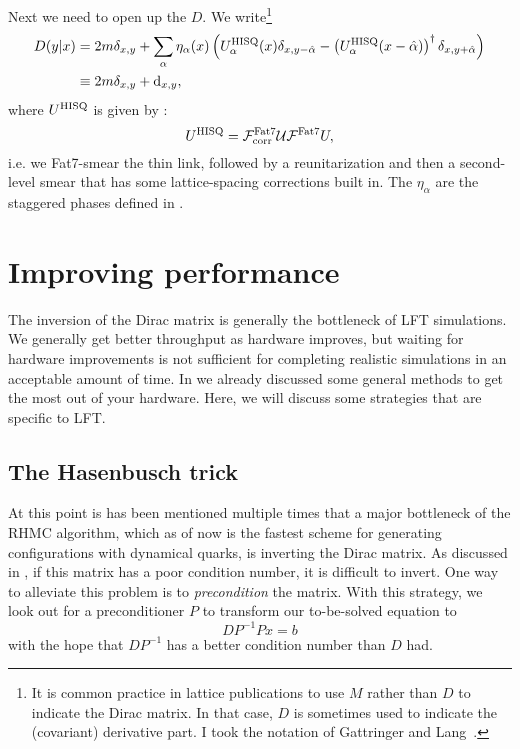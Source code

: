 Next we need to open up the $D$. We write\footnote{It is common practice in
lattice publications to use $M$ rather than $D$ to indicate the Dirac matrix.
In that case, $D$ is sometimes used to indicate the (covariant) derivative part.
I took the notation of Gattringer and Lang~\cite{gattringer_quantum_2010}.}
\begin{equation}\begin{aligned}
D(y|x)&=2m\delta_{x,y}
+\sum_\alpha \eta_\alpha(x)\left(U^{\rm HISQ}_\alpha(x)\delta_{x,y-\hat\alpha}
-\left(U^{\rm HISQ}_\alpha(x-\hat\alpha)\right)^\dagger\delta_{x,y+\hat\alpha}\right)\\
&\equiv 2m\delta_{x,y}+\dd_{x,y},
\end{aligned}\end{equation}
where $U^{\rm HISQ}$ is given by :
\begin{equation}
U^{\rm HISQ}=\mathcal{F}^{\rm Fat7}_{\rm corr}\mathcal{U}\mathcal{F}^{\rm Fat7}U,
\end{equation} 
i.e. we Fat7-smear the thin link, followed
by a reunitarization and then a second-level smear that has some lattice-spacing
corrections built in. The $\eta_\alpha$ are the
staggered phases defined in .



\section{Improving performance}

The inversion of the Dirac matrix is generally the bottleneck of LFT
simulations. We generally get better throughput as hardware improves, 
but waiting for hardware improvements is not sufficient for completing realistic
simulations in an acceptable amount of time. In  we
already discussed some general methods to get the most out of your hardware.
Here, we will discuss some strategies that are specific to LFT.

\subsection{The Hasenbusch trick}

At this point is has been mentioned multiple times that a major bottleneck
of the RHMC algorithm, which as of now is the fastest scheme for
generating configurations with dynamical quarks, is inverting the
Dirac matrix. As discussed in , if this matrix
has a poor condition number, it is difficult to invert.
One way to alleviate this problem is to {\it
precondition} the matrix. With this strategy,
we look out for a preconditioner $P$ to transform our to-be-solved equation to
\begin{equation}
DP^{-1}Px=b
\end{equation}
with the hope that $DP^{-1}$ has a better condition number than $D$ had.

